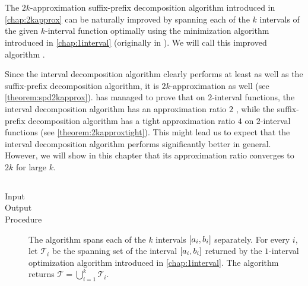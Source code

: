 \chapter{}
\label{chap:betterapprox}

The $2k$-approximation
suffix-prefix decomposition algorithm
introduced in \cref{chap:2kapprox}
can be naturally improved
by spanning each of the $k$ intervals
of the given $k$-interval function
optimally using the minimization algorithm
introduced in \cref{chap:1interval}
(originally in \citet{Schieber2005154}).
We will call this improved algorithm
.

Since the interval decomposition algorithm
clearly performs at least as well
as the suffix-prefix decomposition algorithm,
it is $2k$-approximation as well
(see \cref{theorem:spd2kapprox}).
\citeauthor{Dubovsky2012} has managed
to prove that on $2$-interval functions,
the interval decomposition algorithm
has an approximation ratio $2$
\citep[p.~39]{Dubovsky2012}, %
while the suffix-prefix decomposition algorithm
has a tight approximation ratio $4$
on $2$-interval functions
(see \cref{theorem:2kapproxtight}).
This might lead us to expect
that the interval decomposition algorithm
performs significantly better in general.
However,
we will show in this chapter that its approximation ratio
converges to $2k$ for large $k$.

\section{\algdesctitle}


\begin{algorithm}
\label{algorithm:id}

\hfill

\begin{description}
\item[Input]
\minintinput

\item[Output]
\minintoutput

\item[Procedure]
The algorithm spans each of the $k$ intervals
$[a_i, b_i]$ separately.
For every $i$,
let $\mathcal{T}_i$ be the spanning set of the interval
$[a_i, b_i]$ returned by the $1$-interval
optimization algorithm
introduced in \cref{chap:1interval}.
The algorithm returns
$\mathcal{T} = \bigcup_{i=1}^k{\mathcal{T}_i}$.
\end{description}
\end{algorithm}

